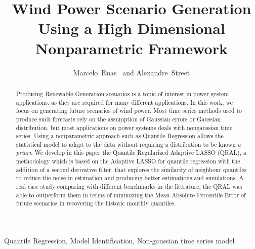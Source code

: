 \documentclass[article,onecolumn]{IEEEtran}
\begin{document}
\title{Wind Power Scenario Generation Using a High Dimensional Nonparametric Framework}

\author{Marcelo~Ruas~%
	and Alexandre~Street%
	
	
}

\maketitle


\begin{abstract}
	Producing Renewable Generation scenarios is a topic of interest in power system applications. as they are required for many different applications. 	In this work, we focus on generating future scenarios of wind power.  Most time series methods used to produce such forecasts rely on the assumption of Gaussian errors or Gaussian distribution, but most applications on power systems deals with nongaussian time series. Using a nonparametric approach such as Quantile Regression allows the statistical model to adapt to the data without requiring a distribution to be known \textit{a priori}. We develop in this paper the Quantile Regularized Adaptive LASSO (QRAL), a methodology which is based on the Adaptive LASSO for quantile regression with the addition of a second derivative filter, that explores the similarity of neighbour quantiles to reduce the noise in estimation and producing better estimations and simulations. A real case study comparing with different benchmarks in the literature, the QRAL was able to outperform them in terms of minimizing the Mean Absolute Percentile Error of future scenarios in recovering the historic monthly quantiles.
\end{abstract}

\begin{IEEEkeywords}
	Quantile Regression, Model Identification, Non-gaussian time series model
\end{IEEEkeywords}
\end{document}
